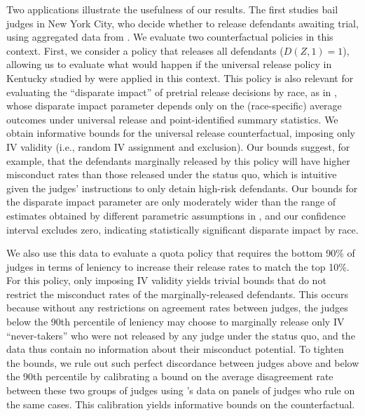 \documentclass[12pt]{article}%
\theoremstyle{definition}
\newcommand\1{\operatorname{I}\indicatorfence}
\begin{document}
Two applications illustrate the usefulness of our results. The first
studies bail judges in New York City, who decide whether to release
defendants awaiting trial, using aggregated data from \textcite{adh22}. We evaluate two
counterfactual policies in this context. First, we consider a policy that
releases all defendants ($D(Z,1)=1$), allowing us to evaluate what would happen
if the universal release policy in Kentucky studied by \textcite{albright22}
were applied in this context. This policy is also relevant for evaluating the
``disparate impact'' of pretrial release decisions by race, as in \textcite{adh22}, whose disparate impact
parameter depends only on the (race-specific)
average outcomes under universal release and point-identified summary statistics. We obtain
informative bounds for the universal release counterfactual, imposing only
\ac{IV} validity (i.e., random IV assignment and exclusion). Our bounds suggest,
for example, that the defendants marginally released by this policy will have
higher misconduct rates than those released under the status quo, which is
intuitive given the judges' instructions to only detain high-risk defendants.
Our bounds for the disparate impact parameter are only moderately wider than the
range of estimates obtained by different parametric assumptions in
\textcite{adh22}, and our confidence interval excludes zero, indicating statistically significant disparate
impact by race.

We also use this data to evaluate a quota policy that requires the bottom 90\%
of judges in terms of leniency to increase their release rates to match the top
10\%. For this policy, only imposing IV validity yields trivial bounds that do
not restrict the misconduct rates of the marginally-released defendants. This
occurs because without any restrictions on agreement rates between judges, the
judges below the 90th percentile of leniency may choose to marginally release
only IV ``never-takers'' who were not released by any judge under the status
quo, and the data thus contain no information about their misconduct potential.
To tighten the bounds, we rule out such perfect discordance between judges above
and below the 90th percentile by calibrating a bound on the average disagreement
rate between these two groups of judges using
\textcite{sigstad_monotonicity_2023}'s data on panels of judges who rule on the
same cases. This calibration yields informative bounds on the counterfactual.
\end{document}
